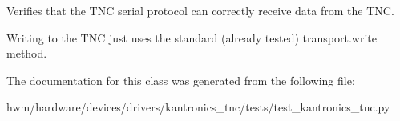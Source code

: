 Verifies that the T\-N\-C serial protocol can correctly receive data from the T\-N\-C. 

Writing to the T\-N\-C just uses the standard (already tested) transport.\-write method. 

The documentation for this class was generated from the following file\-:\begin{DoxyCompactItemize}
\item 
hwm/hardware/devices/drivers/kantronics\-\_\-tnc/tests/test\-\_\-kantronics\-\_\-tnc.\-py\end{DoxyCompactItemize}
